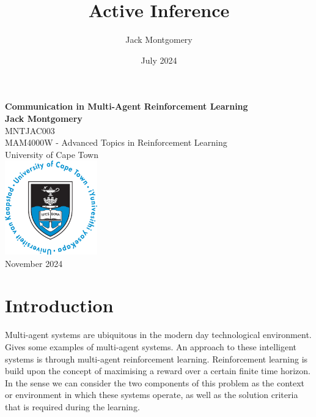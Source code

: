 \documentclass{article}
\title{Active Inference}
\author{Jack Montgomery}
\date{July 2024}
\begin{document}
\begin{titlepage}
    \centering
    \vspace*{1in}
    
    {\LARGE \textbf{Communication in Multi-Agent Reinforcement Learning}}\\[2cm]
    
    {\large \textbf{Jack Montgomery}}\\[0.5cm]
    {\large MNTJAC003}\\[0.5cm]
    {\large MAM4000W - Advanced Topics in Reinforcement Learning}\\ [0.5cm]
    {\large University of Cape Town}\\[2cm]
    
    \includegraphics[width=0.3\textwidth]{images/UCT_logo_circular_blue_large.png}\\[2cm]
    
    {\large November 2024}\\[2.5cm]
    
    \begin{abstract}

    \end{abstract}
    
\end{titlepage}

\newpage

\tableofcontents

\newpage

\section{Introduction}

Multi-agent systems are ubiquitous in the modern day technological environment. Gives some examples of multi-agent systems. An approach to these intelligent systems is through multi-agent reinforcement learning. Reinforcement learning is build upon the concept of maximising a reward over a certain finite time horizon. In the sense we can consider the two components of this problem as the context or environment in which these systems operate, as well as the solution criteria that is required during the learning.
\end{document}
